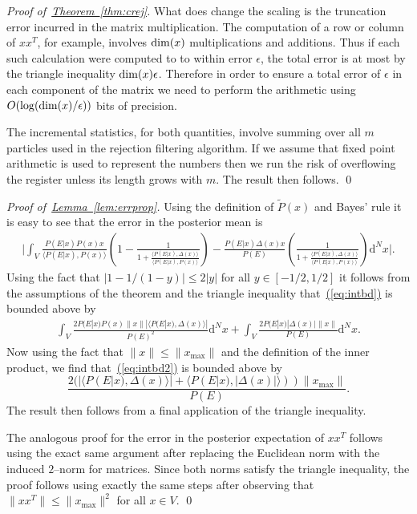 \documentclass[twoside]{article}
\newenvironment{proofof}[1]{\begin{trivlist}\item[]{\flushleft\it
Proof of~#1.}}
{\qed\end{trivlist}}
\newcommand{\eq}[1]{\hyperref[eq:#1]{(\ref*{eq:#1})}}
\newcommand{\thm}[1]{\hyperref[thm:#1]{Theorem~\ref*{thm:#1}}}
\newcommand{\lem}[1]{\hyperref[lem:#1]{Lemma~\ref*{lem:#1}}}
\begin{document}
\begin{proofof}{\thm{crej}}
What does change the scaling is the truncation error incurred in the matrix multiplication.  The computation of a row or column of $xx^T$, for example, involves ${\rm dim}(x)$ multiplications and additions.  Thus if each such calculation were computed to to within error $\epsilon$, the total error is at most by the triangle inequality ${\rm dim}(x) \epsilon$.  Therefore in order to ensure a total error of $\epsilon$ in each component of the matrix we need to perform the arithmetic using $O(\log({\rm dim}(x)/\epsilon))$ bits of precision.  

The incremental statistics, for both quantities, involve summing over all $m$ particles used in the rejection filtering algorithm.  If we assume that fixed point arithmetic is used to represent the numbers then we run the risk of overflowing the register unless its length grows with $m$.  
The result then follows.
\end{proofof}

\begin{proofof}{\lem{errprop}}
Using the definition of $\tilde{P}(x)$ and Bayes' rule it is easy to see that the error in the posterior mean is
\begin{align}
\Biggr| \int_V \frac{P(E|x)P(x)x}{\langle P(E|x),P(x) \rangle}\left( 1 - \frac{1}{1+\frac{\langle P(E|x),\Delta(x)\rangle }{\langle P(E|x),P(x) \rangle}}\right) - \frac{P(E|x) \Delta(x)x}{P(E)}\left(\frac{1}{1+\frac{\langle P(E|x),\Delta(x)\rangle }{\langle P(E|x),P(x) \rangle}} \right)\mathrm{d}^Nx \Biggr|.\label{eq:intbd}
\end{align}
Using the fact that $|1-1/(1-y)| \le 2|y|$ for all $y\in [-1/2,1/2]$ it follows from the assumptions of the theorem and the triangle inequality that~\eq{intbd} is bounded above by
\begin{align}
 \int_V \frac{2P(E|x)P(x)\|x\| |\langle P(E|x),\Delta(x) \rangle|}{P(E)^2}\mathrm{d}^Nx+ \int_V\frac{2P(E|x) |\Delta(x)|\|x\|}{P(E)}\mathrm{d}^Nx.\label{eq:intbd2}
\end{align}
Now using the fact that $\|x\|\le \|x_{\max}\|$ and the definition of the inner product, we find that~\eq{intbd2} is bounded above by
\begin{equation}
\frac{2 (|\langle P(E|x),\Delta(x) \rangle| + \langle P(E|x), |\Delta(x)| \rangle))\|x_{\max}\|}{P(E)}.
\end{equation}
The  result then follows from a final application of the triangle inequality.

The analogous proof for the error in the posterior expectation of $xx^T$ follows using the exact same argument after replacing the Euclidean norm with the induced $2$--norm for matrices.  Since both norms satisfy the triangle inequality, the proof follows using exactly the same steps after observing that $\|xx^T\|\le \|x_{\max}\|^2$ for all $x\in V$.
\end{proofof}
\end{document}
